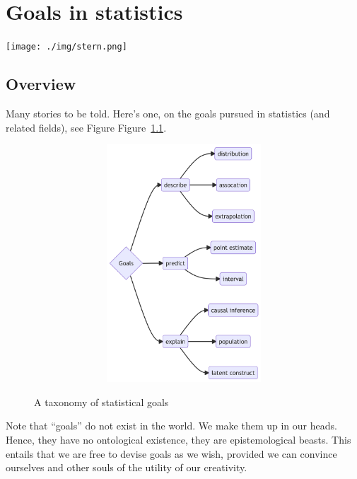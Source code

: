 \documentclass[
  letterpaper,
  DIV=11,
  numbers=noendperiod]{scrreprt}
\theoremstyle{definition}
\theoremstyle{definition}
\theoremstyle{remark}
\begin{document}

\hypertarget{goals-in-statistics}{%
\chapter{Goals in statistics}\label{goals-in-statistics}}

\texttt{[image: ./img/stern.png]}

\hypertarget{overview}{%
\section{Overview}\label{overview}}

Many stories to be told. Here's one, on the goals pursued in statistics
(and related fields), see Figure Figure~\ref{fig-goals}.

\begin{figure}

{\centering 

\begin{figure}[H]

{\centering \includegraphics[width=5.5in,height=3.5in]{./goals_files/figure-latex/mermaid-figure-1.png}

}

\end{figure}

}

\caption{\label{fig-goals}A taxonomy of statistical goals}

\end{figure}

\begin{tcolorbox}[enhanced jigsaw, colback=white, colbacktitle=quarto-callout-note-color!10!white, bottomrule=.15mm, opacityback=0, colframe=quarto-callout-note-color-frame, toptitle=1mm, opacitybacktitle=0.6, coltitle=black, bottomtitle=1mm, title=\textcolor{quarto-callout-note-color}{\faInfo}\hspace{0.5em}{Note}, titlerule=0mm, arc=.35mm, rightrule=.15mm, left=2mm, breakable, toprule=.15mm, leftrule=.75mm]
Note that ``goals'' do not exist in the world. We make them up in our
heads. Hence, they have no ontological existence, they are
epistemological beasts. This entails that we are free to devise goals as
we wish, provided we can convince ourselves and other souls of the
utility of our creativity.
\end{tcolorbox}
\end{document}
